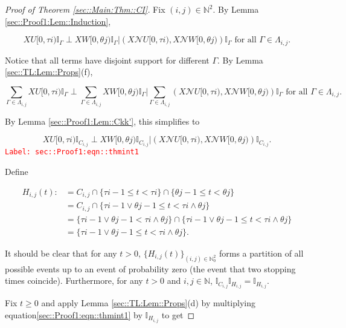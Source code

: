 \documentclass[12pt]{article}
\newcommand{\mb}{\mathbb}
\newcommand{\mc}{\mathcal}
\newcommand{\te}{\text}
\newcommand{\tr}{\textcolor{red}}
\newcommand{\labe}[1]{\tr{\texttt{Label: #1}}}
\newcommand{\ind}{\hspace{24pt}}
\renewcommand{\U}{U}							%
\newcommand{\UU}{W}								%
\renewcommand{\t}{t}							%
\newcommand{\X}{X}								%
\newcommand{\neigh}{\mc{N}}						%
\newcommand{\rt}{\tau}							%
\newcommand{\rtt}{\theta}						%
\newcommand{\apath}{\Gamma}						%
\newcommand{\pathset}[2]{\Lambda_{#1,#2}}		%
\newcommand{\pathsete}[2]{C_{#1,#2}}			%
\newcommand{\pathseted}[2]{H_{#1,#2}}			%
\begin{document}
\begin{proof}[Proof of Theorem \ref{sec::Main:Thm::CI}]

Fix \((i,j) \in \mb{N}^2\). By Lemma \ref{sec::Proof1:Lem::Induction}, 

\[\X{\U}{[0,\rt{i})}\mb{I}_{\apath}\perp \X{\UU}{[0,\rtt{j})}\mb{I}_{\apath}\big|\left(\X{\neigh{\U}}{[0,\rt{i})},\X{\neigh{\UU}}{[0,\rtt{j})}\right)\mb{I}_{\apath}\te{ for all }\apath \in \pathset{i}{j}.\]

Notice that all terms have disjoint support for different \(\apath\). By Lemma \ref{sec::TL:Lem::Props}(f), 

\[\sum_{\apath\in\pathset{i}{j}}\X{\U}{[0,\rt{i})}\mb{I}_{\apath}\perp \sum_{\apath\in\pathset{i}{j}}\X{\UU}{[0,\rtt{j})}\mb{I}_{\apath}\bigg|\sum_{\apath\in\pathset{i}{j}}\left(\X{\neigh{\U}}{[0,\rt{i})},\X{\neigh{\UU}}{[0,\rtt{j})}\right)\mb{I}_{\apath}\te{ for all }\apath \in \pathset{i}{j}.\]

By Lemma \ref{sec::Proof1:Lem::Ckk'}, this simplifies to 

\begin{equation}
\X{\U}{[0,\rt{i})}\mb{I}_{\pathsete{i}{j}}\perp \X{\UU}{[0,\rtt{j})}\mb{I}_{\pathsete{i}{j}}\big|\left(\X{\neigh{\U}}{[0,\rt{i})},\X{\neigh{\UU}}{[0,\rtt{j})}\right)\mb{I}_{\pathsete{i}{j}}.
\label{sec::Proof1:eqn::thmint1}
\end{equation}
\labe{sec::Proof1:eqn::thmint1}

Define

\begin{align*}
\pathseted{i}{j}(\t) :&= \pathsete{i}{j}\cap \{\rt{i-1}\leq \t < \rt{i}\}\cap \{\rtt{j-1} \leq \t < \rtt{j}\}\\
&=\pathsete{i}{j}\cap\{\rt{i-1}\vee\rtt{j-1} \leq \t < \rt{i}\wedge \rtt{j}\}\\
&=\{\rt{i-1}\vee\rtt{j-1}  < \rt{i}\wedge \rtt{j}\} \cap \{\rt{i-1}\vee\rtt{j-1} \leq \t < \rt{i}\wedge \rtt{j}\}\\
&= \{\rt{i-1}\vee\rtt{j-1} \leq \t < \rt{i}\wedge \rtt{j}\}.
\end{align*}

It should be clear that for any \(\t > 0\), \(\{\pathseted{i}{j}(\t)\}_{(i,j)\in\mb{N}_0^2}\) forms a partition of all possible events up to an event of probability zero (the event that two stopping times coincide). Furthermore, for any \(t > 0\) and \(i,j\in \mb{N}\), \(\mb{I}_{\pathsete{i}{j}}\mb{I}_{\pathseted{i}{j}} = \mb{I}_{\pathseted{i}{j}}\).

\ind Fix \(\t \geq 0\) and apply Lemma \ref{sec::TL:Lem::Props}(d) by multiplying equation\eqref{sec::Proof1:eqn::thmint1} by \(\mb{I}_{\pathseted{i}{j}}\) to get


\end{proof}
\end{document}
